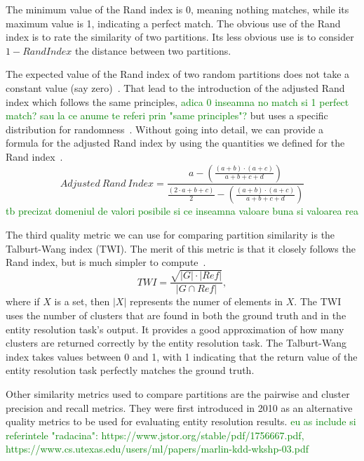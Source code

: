 \documentclass[journal]{IEEEtran}
\begin{document}
    The minimum value of the Rand index is 0, meaning nothing matches, while its
    maximum value is 1, indicating a perfect match.
    The obvious use of the Rand index is to rate the similarity of two
    partitions.
    Its less obvious use is to consider $1 - Rand Index$ the distance between
    two partitions.

    The expected value of the Rand index of two random partitions does not take
    a constant value (say zero)~\cite{adjrand2001}.
    That lead to the introduction of the adjusted Rand index which follows the
    same principles, 
    \textcolor{green}{adica 0 inseamna no match si 1 perfect match? sau la ce anume te referi prin "same principles"?}
    but uses a specific distribution for
    randomness~\cite{adjrand1985}.
    Without going into detail, we can provide a formula for the adjusted Rand
    index by using the quantities we defined for the Rand index~\cite{Tal11}.
    \[
        Adjusted~Rand~Index = \frac{
            a -\left(\frac{(a+b)\cdot(a+c)}{a+b+c+d}\right)
        }{
            \frac{(2\cdot a+b+c)}{2}-\left(\frac{(a+b)\cdot(a+c)}{a+b+c+d}\right)
        }
    \]
    \textcolor{green}{tb precizat domeniul de valori posibile si ce inseamna valoare buna si valoarea rea}

    The third quality metric we can use for comparing partition similarity is
    the Talburt-Wang index (TWI).
    The merit of this metric is that it closely follows the Rand index, but is
    much simpler to compute~\cite{Tal11}.
    \[
        TWI = \frac{\sqrt{|G|\cdot|Ref|}}{|G \cap Ref|},
    \]
    where if $X$ is a set, then $|X|$ represents the numer of elements in $X$. 
    The TWI uses the number of clusters that are found in both the ground
    truth and in the entity resolution task's output.
    It provides a good approximation of how many clusters are returned correctly
    by the entity resolution task.
    The Talburt-Wang index takes values between 0 and 1, with 1 indicating that
    the return value of the entity resolution task perfectly matches the ground
    truth.

    Other similarity metrics used to compare partitions are the pairwise and
    cluster precision and recall metrics.
    They were first introduced in 2010 as an alternative quality
    metrics to be used for evaluating entity resolution results\cite{Men10}. 
    \textcolor{green}{eu as include si referintele "radacina": https://www.jstor.org/stable/pdf/1756667.pdf, https://www.cs.utexas.edu/users/ml/papers/marlin-kdd-wkshp-03.pdf}
\end{document}
